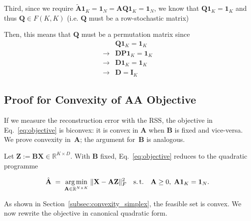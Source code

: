 \documentclass[oneside]{article}
\begin{document}
Third, since we require $\tilde{\mathbf{A}} \mathbf{1}_K = \mathbf{1}_N = \mathbf{A} \mathbf{Q} \mathbf{1}_K = \mathbf{1}_N$, we know that $\mathbf{Q} \mathbf{1}_K = \mathbf{1}_K$ and thus $\mathbf{Q} \in F(K, K)$ (i.e. $\mathbf{Q}$ must be a row-stochastic matrix)

Then, this means that $\mathbf{Q}$ must be a permutation matrix since
\begin{equation}
    \begin{aligned}
        &\mathbf{Q} \mathbf{1}_K = \mathbf{1}_K \\
        \rightarrow &\mathbf{D} \mathbf{P} \mathbf{1}_K = \mathbf{1}_K \\
        \rightarrow &\mathbf{D} \mathbf{1}_K = \mathbf{1}_K \\
        \rightarrow &\mathbf{D} = \mathbf{I}_K
    \end{aligned}
\end{equation}


\subsection{Proof for Convexity of AA Objective}
\label{subsec:proof_convexity}

If we measure the reconstruction error with the RSS, the objective in Eq.~\eqref{eq:objective} is biconvex: it is convex in $\mathbf{A}$ when $\mathbf{B}$ is fixed and vice-versa. We prove convexity in~$\mathbf{A}$; the argument for~$\mathbf{B}$ is analogous.

Let $\mathbf Z := \mathbf{B} \mathbf{X} \in \mathbb R^{K\times D}$. With $\mathbf{B}$ fixed, Eq.~\eqref{eq:objective} reduces to the quadratic programme

\begin{equation}
\label{eq:A_subproblem}
    \hat{\mathbf{A}}\;=\;
    \underset{\mathbf{A}\in\mathbb R^{N\times K}}{\arg\min}\;
    \|\mathbf X-\mathbf{A}\mathbf Z\|_F^{2}
    \quad\text{s.\,t.}\quad
    \mathbf{A}\ge0,\;
    \mathbf{A}\mathbf 1_K=\mathbf 1_N .
\end{equation}

As shown in Section~\ref{subsec:convexity_simplex}, the feasible set is convex. We now rewrite the objective in canonical quadratic form.
\end{document}
